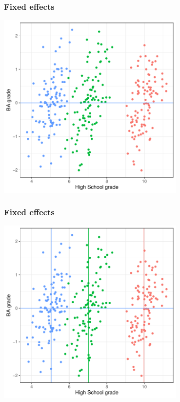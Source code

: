\documentclass[aspectratio=43]{beamer}
\begin{document}
\begin{frame}
\frametitle{Fixed effects}
\centering

\includegraphics[width = 0.7\textwidth]{../img/fe6}

\end{frame}

\begin{frame}
\frametitle{Fixed effects}
\centering

\includegraphics[width = 0.7\textwidth]{../img/fe7}

\end{frame}
\end{document}
